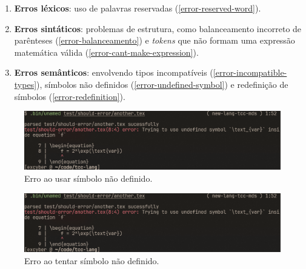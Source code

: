 \begin{enumerate}
   \item \textbf{Erros léxicos}: uso de palavras reservadas (\autoref{error-reserved-word}).
   
   \item \textbf{Erros sintáticos}: problemas de estrutura, como balanceamento incorreto de parênteses (\autoref{error-balanceamento}) e \textit{tokens} que não formam uma expressão matemática válida (\autoref{error-cant-make-expression}).
   
   \item \textbf{Erros semânticos}: envolvendo tipos incompatíveis (\autoref{error-incompatible-types}), símbolos não definidos (\autoref{error-undefined-symbol}) e redefinição de símbolos (\autoref{error-redefinition}).
\end{enumerate}



\begin{figure}[H]
    \caption{\label{error-undefined-symbol} \small Erro ao usar símbolo não definido.}
    \begin{center}
        \includegraphics[scale=0.5]{./Imagens/error-undefined-symbol.png}
    \end{center}
\end{figure}

\begin{figure}[H]
    \caption{\label{error-undefined-symbol} \small Erro ao tentar símbolo não definido.}
    \begin{center}
        \includegraphics[scale=0.5]{./Imagens/error-undefined-symbol.png}
    \end{center}
\end{figure}

